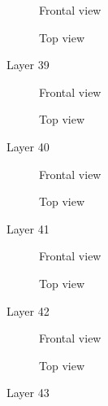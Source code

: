 \begin{figure}[h]
    \centering
    \begin{subfigure}[b]{.45\linewidth}
        
        \caption{Frontal view}
    \end{subfigure}
    \begin{subfigure}[b]{.45\linewidth}
        
        \caption{Top view}
    \end{subfigure}
    \caption{Layer 39}
\end{figure}
\begin{figure}[h]
    \centering
    \begin{subfigure}[b]{.45\linewidth}
        
        \caption{Frontal view}
    \end{subfigure}
    \begin{subfigure}[b]{.45\linewidth}
        
        \caption{Top view}
    \end{subfigure}
    \caption{Layer 40}
\end{figure}
\begin{figure}[h]
    \centering
    \begin{subfigure}[b]{.45\linewidth}
        
        \caption{Frontal view}
    \end{subfigure}
    \begin{subfigure}[b]{.45\linewidth}
        
        \caption{Top view}
    \end{subfigure}
    \caption{Layer 41}
\end{figure}
\begin{figure}[h]
    \centering
    \begin{subfigure}[b]{.45\linewidth}
        
        \caption{Frontal view}
    \end{subfigure}
    \begin{subfigure}[b]{.45\linewidth}
        
        \caption{Top view}
    \end{subfigure}
    \caption{Layer 42}
\end{figure}
\begin{figure}[h]
    \centering
    \begin{subfigure}[b]{.45\linewidth}
        
        \caption{Frontal view}
    \end{subfigure}
    \begin{subfigure}[b]{.45\linewidth}
        
        \caption{Top view}
    \end{subfigure}
    \caption{Layer 43}
\end{figure}
